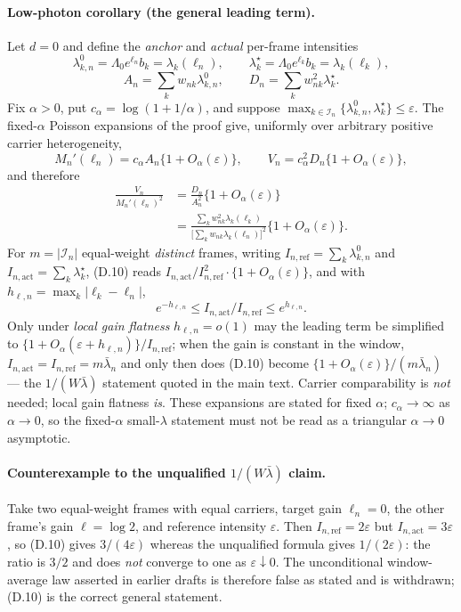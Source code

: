 \paragraph{Low-photon corollary (the general leading term).} Let $d=0$ and define the \emph{anchor} and \emph{actual} per-frame intensities
\[
\lambda_{k,n}^{0}=\Lambda_0e^{\ell_n}b_k=\lambda_k(\ell_n),
\qquad
\lambda_k^\star=\Lambda_0e^{\ell_k}b_k=\lambda_k(\ell_k),
\]
\[
A_n=\sum_kw_{nk}\lambda_{k,n}^{0},\qquad
D_n=\sum_kw_{nk}^2\lambda_k^\star .
\]
Fix $\alpha>0$, put $c_\alpha=\log(1+1/\alpha)$, and suppose $\max_{k\in\mathcal I_n}\{\lambda_{k,n}^{0},\lambda_k^\star\}\le\varepsilon$. The fixed-$\alpha$ Poisson expansions of the proof give, uniformly over arbitrary positive carrier heterogeneity,
\[
M_n'(\ell_n)=c_\alpha A_n\{1+O_\alpha(\varepsilon)\},\qquad
V_n=c_\alpha^2D_n\{1+O_\alpha(\varepsilon)\},
\]
and therefore
\begin{equation}
\begin{aligned}
\frac{V_n}{M_n'(\ell_n)^2}
&=\frac{D_n}{A_n^2}\{1+O_\alpha(\varepsilon)\}\\
&=\frac{\sum_kw_{nk}^2\lambda_k(\ell_k)}
      {\big[\sum_kw_{nk}\lambda_k(\ell_n)\big]^2}\{1+O_\alpha(\varepsilon)\}.
\end{aligned}
\tag{D.10}
\end{equation}
For $m=|\mathcal I_n|$ equal-weight \emph{distinct} frames, writing $I_{n,\mathrm{ref}}=\sum_k\lambda_{k,n}^{0}$ and $I_{n,\mathrm{act}}=\sum_k\lambda_k^\star$, (D.10) reads $I_{n,\mathrm{act}}/I_{n,\mathrm{ref}}^2\cdot\{1+O_\alpha(\varepsilon)\}$, and with $h_{\ell,n}=\max_k|\ell_k-\ell_n|$,
\[
e^{-h_{\ell,n}}\le I_{n,\mathrm{act}}/I_{n,\mathrm{ref}}\le e^{h_{\ell,n}} .
\]
Only under \emph{local gain flatness} $h_{\ell,n}=o(1)$ may the leading term be simplified to $\{1+O_\alpha(\varepsilon+h_{\ell,n})\}/I_{n,\mathrm{ref}}$; when the gain is constant in the window, $I_{n,\mathrm{act}}=I_{n,\mathrm{ref}}=m\bar\lambda_n$ and only then does (D.10) become $\{1+O_\alpha(\varepsilon)\}/(m\bar\lambda_n)$ --- the $1/(W\bar\lambda)$ statement quoted in the main text. Carrier comparability is \emph{not} needed; local gain flatness \emph{is}. These expansions are stated for fixed $\alpha$; $c_\alpha\to\infty$ as $\alpha\to0$, so the fixed-$\alpha$ small-$\lambda$ statement must not be read as a triangular $\alpha\to0$ asymptotic.

\paragraph{Counterexample to the unqualified $1/(W\bar\lambda)$ claim.} Take two equal-weight frames with equal carriers, target gain $\ell_n=0$, the other frame's gain $\ell=\log2$, and reference intensity $\varepsilon$. Then $I_{n,\mathrm{ref}}=2\varepsilon$ but $I_{n,\mathrm{act}}=3\varepsilon$, so (D.10) gives $3/(4\varepsilon)$ whereas the unqualified formula gives $1/(2\varepsilon)$: the ratio is $3/2$ and does \emph{not} converge to one as $\varepsilon\downarrow0$. The unconditional window-average law asserted in earlier drafts is therefore false as stated and is withdrawn; (D.10) is the correct general statement.

